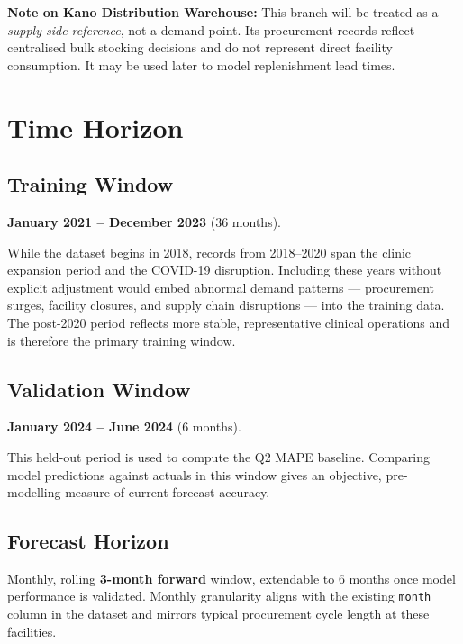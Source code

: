 \documentclass[12pt, a4paper]{article}
\begin{document}
\begin{mdframed}[style=notebox]
\textbf{Note on Kano Distribution Warehouse:} This branch will be treated as a
\textit{supply-side reference}, not a demand point. Its procurement records
reflect centralised bulk stocking decisions and do not represent direct facility
consumption. It may be used later to model replenishment lead times.
\end{mdframed}

\section{Time Horizon}

\subsection{Training Window}

\textbf{January 2021 -- December 2023} (36 months).

While the dataset begins in 2018, records from 2018--2020 span the clinic
expansion period and the COVID-19 disruption. Including these years without
explicit adjustment would embed abnormal demand patterns --- procurement
surges, facility closures, and supply chain disruptions --- into the training
data. The post-2020 period reflects more stable, representative clinical
operations and is therefore the primary training window.

\subsection{Validation Window}

\textbf{January 2024 -- June 2024} (6 months).

This held-out period is used to compute the Q2 MAPE baseline. Comparing model
predictions against actuals in this window gives an objective, pre-modelling
measure of current forecast accuracy.

\subsection{Forecast Horizon}

Monthly, rolling \textbf{3-month forward} window, extendable to 6 months once
model performance is validated. Monthly granularity aligns with the existing
\texttt{month} column in the dataset and mirrors typical procurement cycle
length at these facilities.
\end{document}
